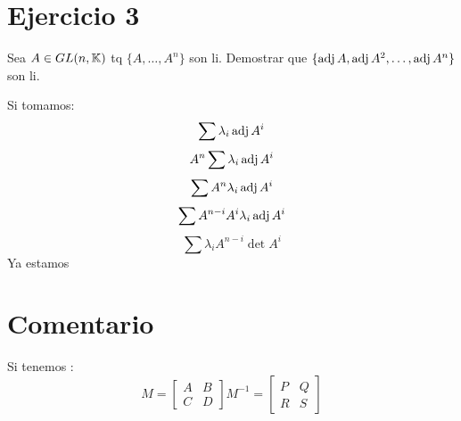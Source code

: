 \documentclass{article}
\begin{document}
\section*{Ejercicio 3}
Sea $A \in GL(n, \mathbb{K})$ tq $\{A, \dots, A^n\}$ son li. Demostrar que $\{\operatorname{adj} A, \operatorname{adj} A^2, \dots, \operatorname{adj} A^n\}$ son li.

Si tomamos:
\[
	\sum \lambda_i \operatorname{adj} A^i
\]
\[
	A^n \sum \lambda_i \operatorname{adj} A^i
\]
\[
	\sum A^n \lambda_i \operatorname{adj} A^i
\]
\[
	\sum A^{n-i} A^i \lambda_i \operatorname{adj} A^i
\]
\[
	\sum \lambda_i A^{n-i} \det A^i
\]
Ya estamos

\section*{Comentario}
Si tenemos :
\[
	M = 
	\begin{bmatrix}
		A & B \\
		C & D
	\end{bmatrix}
	M^{-1} = 
	\begin{bmatrix}
		P & Q \\
		R & S
	\end{bmatrix}
\]
\end{document}
